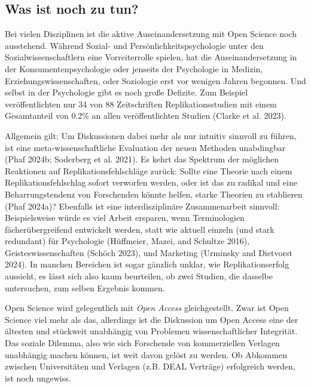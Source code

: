 \documentclass[
  letterpaper,
  DIV=11,
  numbers=noendperiod]{scrreprt}
\begin{document}
\subsection*{Was ist noch zu tun?}\label{was-ist-noch-zu-tun}

Bei vielen Disziplinen ist die aktive Auseinandersetzung mit Open
Science noch ausstehend. Während Sozial- und Persönlichkeitspsychologie
unter den Sozialwissenschaftlern eine Vorreiterrolle spielen, hat die
Auseinandersetzung in der Konsumentenpsychologie oder jenseits der
Psychologie in Medizin, Erziehungswissenschaften, oder Soziologie erst
vor wenigen Jahren begonnen. Und selbst in der Psychologie gibt es noch
große Defizite. Zum Beispiel veröffentlichten nur 34 von 88
Zeitschriften Replikationsstudien mit einem Gesamtanteil von 0.2\% an
allen veröffentlichten Studien (Clarke et al. 2023).

Allgemein gilt: Um Diskussionen dabei mehr als nur intuitiv sinnvoll zu
führen, ist eine meta-wissenschaftliche Evaluation der neuen Methoden
unabdingbar (Phaf 2024b; Soderberg et al. 2021). Es kehrt das Spektrum
der möglichen Reaktionen auf Replikationsfehlschläge zurück: Sollte eine
Theorie nach einem Replikationsfehlschlag sofort verworfen werden, oder
ist das zu radikal und eine Beharrungstendenz von Forschenden könnte
helfen, starke Theorien zu etablieren (Phaf 2024a)? Ebenfalls ist eine
interdisziplinäre Zusammenarbeit sinnvoll: Beispielsweise würde es viel
Arbeit ersparen, wenn Terminologien fächerübergreifend entwickelt
werden, statt wie aktuell einzeln (und stark redundant) für Psychologie
(Hüffmeier, Mazei, and Schultze 2016), Geisteswissenschaften (Schöch
2023), und Marketing (Urminsky and Dietvorst 2024). In manchen Bereichen
ist sogar gänzlich unklar, wie Replikationserfolg aussieht, es lässt
sich also kaum beurteilen, ob zwei Studien, die dasselbe untersuchen,
zum selben Ergebnis kommen.

Open Science wird gelegentlich mit \emph{Open Access} gleichgestellt.
Zwar ist Open Science viel mehr als das, allerdings ist die Diskussion
um Open Access eine der ältesten und stückweit unabhängig von Problemen
wissenschaftlicher Integrität. Das soziale Dilemma, also wie sich
Forschende von kommerziellen Verlagen unabhängig machen können, ist weit
davon gelöst zu werden. Ob Abkommen zwischen Universitäten und Verlagen
(z.B. DEAL Verträge) erfolgreich werden, ist noch ungewiss.
\end{document}
